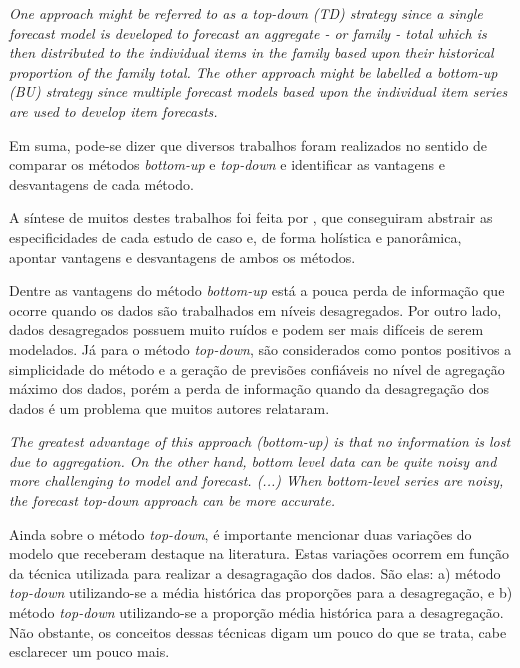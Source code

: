 \documentclass[
	12pt,				%
	openright,			%
	twoside,			%
	a4paper,			%
	english,			%
	french,				%
	spanish,			%
	brazil				%
	]{abntex2}
\begin{document}
\begin{citacao}
\emph{One approach might be referred to as a top-down (TD) strategy since a single forecast model is developed to forecast an aggregate - or family -  total which is then distributed to the individual items in the family based upon their historical proportion of the family total. The other approach might be labelled a bottom-up (BU) strategy since multiple forecast models based upon the individual item series are used to develop item forecasts.}
\end{citacao}

Em suma, pode-se dizer que diversos trabalhos foram realizados no sentido de comparar os métodos \emph{bottom-up} e \emph{top-down} e identificar as vantagens e desvantagens de cada método. 

A síntese de muitos destes trabalhos foi feita por , que conseguiram abstrair as especificidades de cada estudo de caso e, de forma holística e panorâmica, apontar vantagens e desvantagens de ambos os métodos. 

Dentre as vantagens do método \emph{bottom-up} está a pouca perda de informação que ocorre quando os dados são trabalhados em níveis desagregados. Por outro lado, dados desagregados possuem muito ruídos e podem ser mais difíceis de serem modelados.
Já para o método \emph{top-down}, são considerados como pontos positivos a simplicidade do método e a geração de previsões confiáveis no nível de agregação máximo dos dados, porém a perda de informação quando da desagregação dos dados é um problema que muitos autores relataram.

\begin{citacao}
\emph{The greatest advantage of this approach (bottom-up) is that no information is lost due to aggregation. On the other hand, bottom level data can be quite noisy and more challenging to model and forecast.
(...)
When bottom-level series are noisy, the forecast top-down approach can be more accurate.}\cite{hyndman2009}
\end{citacao}

Ainda sobre o método \emph{top-down}, é importante mencionar duas variações do modelo que receberam destaque na literatura. Estas variações ocorrem em função da técnica utilizada para realizar a desagragação dos dados. São elas: a) método \emph{top-down} utilizando-se a média histórica das proporções para a desagregação, e b) método \emph{top-down} utilizando-se a proporção média histórica para a desagregação. Não obstante, os conceitos dessas técnicas  digam um pouco do que se trata, cabe esclarecer um pouco mais. 
\end{document}
